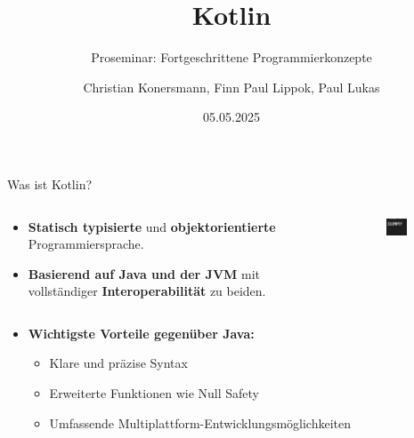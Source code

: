 \documentclass{beamer}
\title{Kotlin}
\subtitle{Proseminar: Fortgeschrittene Programmierkonzepte}
\author[C. Konersmann, F. Lippok, P. Lukas]{
  Christian Konersmann, Finn Paul Lippok, Paul Lukas
}
\date{05.05.2025}
\begin{document}
\frame{\titlepage}

\begin{frame}{Was ist Kotlin?}
  \begin{columns}
    \begin{column}{0.7\textwidth}
      \begin{itemize}
        \item \textbf{Statisch typisierte} und \textbf{objektorientierte} Programmiersprache.
        \item \textbf{Basierend auf Java und der JVM} mit vollständiger \textbf{Interoperabilität} zu beiden.
      \end{itemize}
    \end{column}
    \begin{column}{0.3\textwidth}
      \begin{figure}
        \centering
        \includegraphics[width=0.6\textwidth]{Kotlin Full Color Logo Mark RGB.png}
      \end{figure}
    \end{column}
  \end{columns}
  \pause\vspace{0.5cm}
  \begin{itemize}
    \item \textbf{Wichtigste Vorteile gegenüber Java:} %
    \begin{itemize} %
      \item Klare und präzise Syntax
      \item Erweiterte Funktionen wie Null Safety
      \item Umfassende Multiplattform-Entwicklungsmöglichkeiten
    \end{itemize}
  \end{itemize}
\end{frame}
\end{document}
